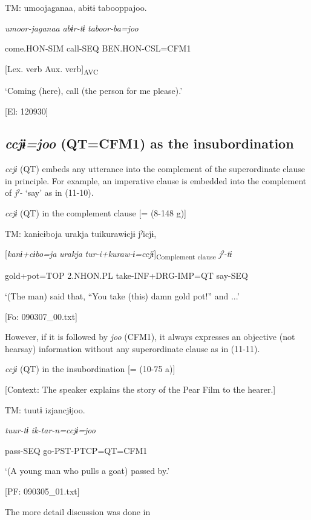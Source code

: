   \ex  TM:  umoojaganaa,  abɨtɨ  tabooppajoo.

      \textit{umoor-jaganaa}  \textit{abɨr-tɨ}  \textit{taboor-ba=joo}

      come.HON-SIM  call-SEQ  BEN.HON-CSL=CFM1

        [Lex. verb  Aux. verb]\textsubscript{AVC}

      ‘Coming (here), call (the person for me please).’

      [El: 120930]
\z
\z

\subsection{\textit{ccjɨ=joo} (QT=CFM1) as the insubordination}\label{sec:11.2.3}

\textit{ccjɨ} (QT) embeds any utterance into the complement of the superordinate clause in principle. For example, an imperative clause is embedded into the complement of \textit{jˀ-} ‘say’ as in (11-10).

\ea\label{ex:11-10}  \textit{ccjɨ} (QT) in the complement clause [= (8-148 g)]

  TM:  kanɨcɨboja  urakja  tuikurawɨcjɨ  jˀicjɨ,

    [\textit{kanɨ+cɨbo=ja}  \textit{urakja}  \textit{tur-i+kuraw-ɨ=ccjɨ}]\textsubscript{Complement clause}  \textit{jˀ-tɨ}

    gold+pot=TOP  2.NHON.PL  take-INF+DRG-IMP=QT  say-SEQ

    ‘(The man) said that, “You take (this) damn gold pot!” and ...’

    [Fo: 090307\_00.txt]
\z

However, if it is followed by \textit{joo} (CFM1), it always expresses an objective (not hearsay) information without any superordinate clause as in (11-11).

\ea\label{ex:11-11}  \textit{ccjɨ} (QT) in the insubordination [= (10-75 a)]

  [Context: The speaker explains the story of the Pear Film to the hearer.]

  TM:  tuutɨ  izjancjɨjoo.

    \textit{tuur-tɨ}  \textit{ik-tar-n=ccjɨ=joo}

    pass-SEQ  go-PST-PTCP=QT=CFM1

    ‘(A young man who pulls a goat) passed by.’

    [PF: 090305\_01.txt]
\z

The more detail discussion was done in 

